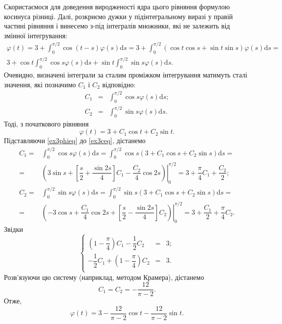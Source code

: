 \documentclass[14pt,twoside]{extreport}
\theoremstyle{mystyle}
\numberwithin{equation}{chapter}
\begin{document}
\begin{small}
Скористаємося для доведення виродженості ядра цього рівняння формулою косинуса різниці. Далі, розкриємо дужки у підінтегральному виразі у правій частині рівняння і винесемо з-під інтегралів множники, які не залежить від змінної інтегрування:
\begin{multline*}
\varphi(t) = 3 + \int_{0}^{\pi/2} \cos(t-s) \varphi(s) \mathrm{d}s = 3 + \int_{0}^{\pi/2} \left(\cos t \cos s + \sin t \sin s \right) \varphi(s) \mathrm{d}s=\\
3 + \cos t \int_{0}^{\pi/2} \cos s \varphi(s) \mathrm{d}s + \sin t \int_{0}^{\pi/2} \sin s \varphi(s) \mathrm{d}s.
\end{multline*}
Очевидно, визначені інтеграли за сталим проміжком інтегрування матимуть сталі значення, які позначимо $C_1$ і $C_2$ відповідно:
\begin{equation}\label{ex3ceq}
\begin{array}{lll}
C_1 &=& \displaystyle\int_{0}^{\pi/2} \cos s \varphi(s) \mathrm{d}s;\\
C_2 &=& \displaystyle\int_{0}^{\pi/2} \sin s \varphi(s) \mathrm{d}s.
\end{array}
\end{equation}
Тоді, з початкового рівняння
\begin{equation}\label{ex3phieq}
\varphi(t) = 3 + C_1 \cos t + C_2 \sin t.
\end{equation}
Підставляючи \eqref{ex3phieq} до \eqref{ex3ceq}, дістанемо
\begin{align*}
C_1 = &\displaystyle\int_{0}^{\pi/2} \cos s \varphi(s) \mathrm{d}s = \int_{0}^{\pi/2} \cos s \left(3 + C_1 \cos s + C_2 \sin s\right) \mathrm{d}s =\\
 = & \left.\left(3 \sin s + \left[\dfrac{s}{2} + \dfrac{\sin 2s}{4}\right] C_1 - \dfrac{C_2}{4}\cos 2s\right)\right|_{0}^{\pi/2} = 3 + \dfrac{\pi}{4} C_1 + \dfrac{C_2}{2};\\
C_2 = &\displaystyle\int_{0}^{\pi/2} \sin s \varphi(s) \mathrm{d}s = \int_{0}^{\pi/2} \sin s \left(3 + C_1 \cos s + C_2 \sin s\right) \mathrm{d}s =\\
= & \left.\left(-3 \cos s + \dfrac{C_1}{4} \cos 2s + \left[\dfrac{s}{2} - \dfrac{\sin 2s}{4}\right] C_2\right)\right|_{0}^{\pi/2} = 3 + \dfrac{C_1}{2} + \dfrac{\pi}{4} C_2.
\end{align*}
Звідки
\[
\left\{
\begin{array}{lll}
\left(1-\dfrac{\pi}{4}\right)C_1 -\dfrac{1}{2}C_2 &=& 3;\\
-\dfrac{1}{2}C_1 +\left(1 - \dfrac{\pi}{4}\right)C_2 &=& 3.\\
\end{array}
\right.
\]
Розв'язуючи цю систему (наприклад, методом Крамера), дістанемо
\[
C_1=C_2=-\dfrac{12}{\pi - 2}.
\]
Отже,
\[
\varphi(t) = 3 - \dfrac{12}{\pi - 2} \cos t - \dfrac{12}{\pi - 2} \sin t.
\]


\end{small}
\end{document}
